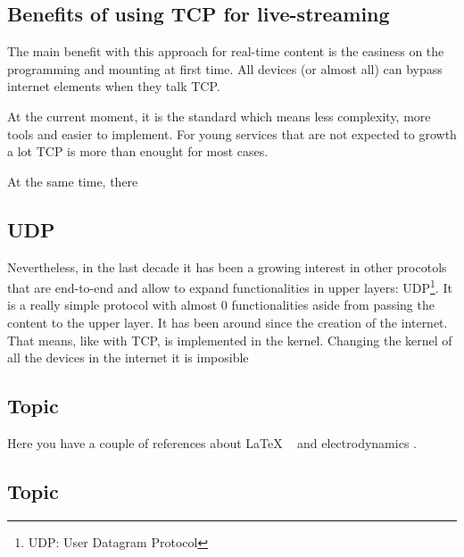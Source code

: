 \subsection{Benefits of using TCP for live-streaming}
{
    The main benefit with this approach for real-time content is the easiness on the programming and mounting at first time. All devices (or almost all) can
    bypass internet elements when they talk TCP. 
 
    
    At the current moment, it is the standard which means less complexity, more tools and easier to implement. For
    young services that are not expected to growth a lot TCP is more than enought for most cases.

    At the same time, there 
}

\subsection{UDP}{
    
    Nevertheless, in the last decade it has been a growing interest in other procotols that are end-to-end and allow to expand functionalities in upper layers:
    UDP\footnote{UDP: User Datagram Protocol}. It is a really simple protocol with almost 0 functionalities aside from passing the content to the upper layer.
    It has been around since the creation of the internet. That means, like with TCP, is implemented in the kernel. Changing the kernel of all the devices in
    the internet it is imposible 
}

\subsection{Topic}

Here you have a couple of references about LaTeX ~\cite{latexcompanion} and electrodynamics \cite{einstein}.

\bigskip

\subsection{Topic}
